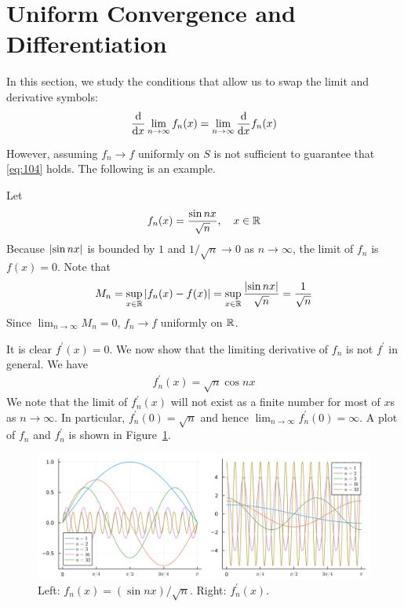 \documentclass[thmcnt=section, 12pt]{my-elegantbook}
\begin{document}

\section{Uniform Convergence and Differentiation}

In this section, we study the conditions that allow us to swap the limit and derivative symbols:
\begin{align}
    \odvs{\lim_{n \to \infty} f_n(x)}{x}
    = \lim_{n \to \infty} \odvs{f_n(x)}{x}
    \label{eq:104}
\end{align}

However, assuming $f_n \to f$ uniformly on $S$ is not sufficient to guarantee that \eqref{eq:104} holds. The following is an example.

\begin{example}
    Let 
    \begin{align*}
        f_n(x) = \frac{\sin nx}{\sqrt{n}}, 
        \quad x \in \mathbb{R}
    \end{align*}
    Because $\left\lvert \sin nx \right\rvert$ is bounded by $1$ and $1 / \sqrt{n} \to 0$ as $n \to \infty$, the limit of $f_n$ is $f(x) = 0$. Note that 
    \begin{align*}
        M_n = \sup_{x \in \mathbb{R}} \left\lvert f_n(x) - f(x) \right\rvert
        = \sup_{x \in \mathbb{R}} \frac{\left\lvert \sin nx \right\rvert}{\sqrt{n}}
        = \frac{1}{\sqrt{n}}
    \end{align*}
    Since $\lim_{n \to \infty} M_n = 0$, $f_n \to f$ uniformly on $\mathbb{R}$.

    It is clear $f^\prime(x) = 0$. We now show that the limiting derivative of $f_n$ is not $f^\prime$ in general. We have 
    \begin{align*}
        f^\prime_n(x) = \sqrt{n} \cos nx
    \end{align*}
    We note that the limit of $f^\prime_n(x)$ will not exist as a finite number for most of $x$s as $n \to \infty$. In particular, $f^\prime_n(0) = \sqrt{n}$ and hence $\lim_{n \to \infty} f^\prime_n(0) = \infty$. A plot of $f_n$ and $f^\prime_n$ is shown in Figure~\ref{fig:11}.

    \begin{figure}[ht]
        \centering
        \includegraphics[scale=0.2]{figures/graph-010.png}
        \caption{Left: $f_n(x) = (\sin nx) / \sqrt{n}$. Right: $f^\prime_n(x)$.}
        \label{fig:11}
    \end{figure}
\end{example}
\end{document}
